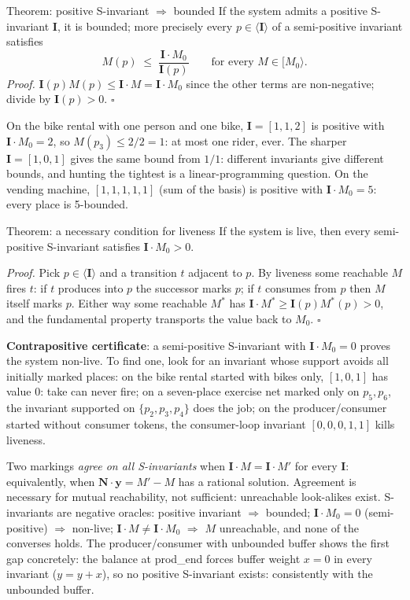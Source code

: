 \begin{notebox}{Theorem: positive S-invariant $\Rightarrow$ bounded}
If the system admits a positive S-invariant $\mathbf{I}$, it is bounded; more precisely every $p \in \langle \mathbf{I} \rangle$ of a semi-positive invariant satisfies
\[
  M(p) \;\leq\; \frac{\mathbf{I} \cdot M_0}{\mathbf{I}(p)} \qquad \text{for every } M \in [M_0\rangle.
\]
\textit{Proof.} $\mathbf{I}(p) M(p) \leq \mathbf{I} \cdot M = \mathbf{I} \cdot M_0$ since the other terms are non-negative; divide by $\mathbf{I}(p) > 0$. \hfill$\square$
\end{notebox}

On the bike rental with one person and one bike, $\mathbf{I} = [1,1,2]$ is positive with $\mathbf{I} \cdot M_0 = 2$, so $M(p_3) \leq 2/2 = 1$: at most one rider, ever. The sharper $\mathbf{I} = [1,0,1]$ gives the same bound from $1/1$: different invariants give different bounds, and hunting the tightest is a linear-programming question. On the vending machine, $[1,1,1,1,1]$ (sum of the basis) is positive with $\mathbf{I} \cdot M_0 = 5$: every place is 5-bounded.

\begin{notebox}{Theorem: a necessary condition for liveness}
If the system is live, then every semi-positive S-invariant satisfies $\mathbf{I} \cdot M_0 > 0$.
\par\smallskip
\textit{Proof.} Pick $p \in \langle \mathbf{I} \rangle$ and a transition $t$ adjacent to $p$. By liveness some reachable $M$ fires $t$: if $t$ produces into $p$ the successor marks $p$; if $t$ consumes from $p$ then $M$ itself marks $p$. Either way some reachable $M^*$ has $\mathbf{I} \cdot M^* \geq \mathbf{I}(p) M^*(p) > 0$, and the fundamental property transports the value back to $M_0$. \hfill$\square$
\par\smallskip
\textbf{Contrapositive certificate}: a semi-positive S-invariant with $\mathbf{I} \cdot M_0 = 0$ proves the system non-live. To find one, look for an invariant whose support avoids all initially marked places: on the bike rental started with bikes only, $[1,0,1]$ has value 0: \textsf{take} can never fire; on a seven-place exercise net marked only on $p_5, p_6$, the invariant supported on $\{p_2, p_3, p_4\}$ does the job; on the producer/consumer started without consumer tokens, the consumer-loop invariant $[0,0,0,1,1]$ kills liveness.
\end{notebox}

Two markings \emph{agree on all S-invariants} when $\mathbf{I} \cdot M = \mathbf{I} \cdot M'$ for every $\mathbf{I}$: equivalently, when $\mathbf{N} \cdot \mathbf{y} = M' - M$ has a rational solution. Agreement is necessary for mutual reachability, not sufficient: unreachable look-alikes exist. S-invariants are negative oracles: positive invariant $\Rightarrow$ bounded; $\mathbf{I} \cdot M_0 = 0$ (semi-positive) $\Rightarrow$ non-live; $\mathbf{I} \cdot M \neq \mathbf{I} \cdot M_0$ $\Rightarrow$ $M$ unreachable, and none of the converses holds. The producer/consumer with unbounded buffer shows the first gap concretely: the balance at \textsf{prod\_end} forces buffer weight $x = 0$ in every invariant ($y = y + x$), so no positive S-invariant exists: consistently with the unbounded buffer.

